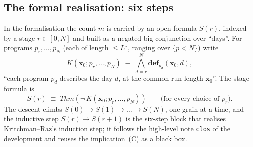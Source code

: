 \documentclass[11pt]{article}
\theoremstyle{plain}
\theoremstyle{definition}
\theoremstyle{remark}
\newcommand{\defp}{\mathbf{def}}
\newcommand{\Kc}{K}
\newcommand{\Thm}[1]{\mathit{Thm}(#1)}
\newcommand{\Lstar}{L^{\!\star}}
\begin{document}
\subsection{The formal realisation: six steps}
\label{sec:sixsteps}

In the formalisation the count $m$ is carried by an open formula
$S(r)$, indexed by a stage $r \in [0,N]$ and built as a negated big
conjunction over ``days''. For programs $p_r,\dots,p_N$ (each of length
$\le\Lstar$, ranging over $\{p<N\}$) write
\[
  \Kc(\mathbf{x}_0; p_r,\dots,p_N) \;\equiv\;
    \bigwedge_{d=r}^{N} \defp_{p_d}(\mathbf{x}_0, d),
\]
``each program $p_d$ describes the day $d$, at the common run-length
$\mathbf{x}_0$''. The stage formula is
\[
  S(r) \;\equiv\;
    \Thm{\neg\,\Kc(\mathbf{x}_0; p_r,\dots,p_N)}
    \qquad\text{(for every choice of $p_r$).}
\]
The descent climbs $S(0) \to S(1) \to \dots \to S(N)$, one grain at a
time, and the inductive step $S(r)\to S(r+1)$ is the six-step block that
realises Kritchman--Raz's induction step; it follows the high-level note
\texttt{clos} of the development and reuses the implication~(C) as a
black box.
\end{document}
